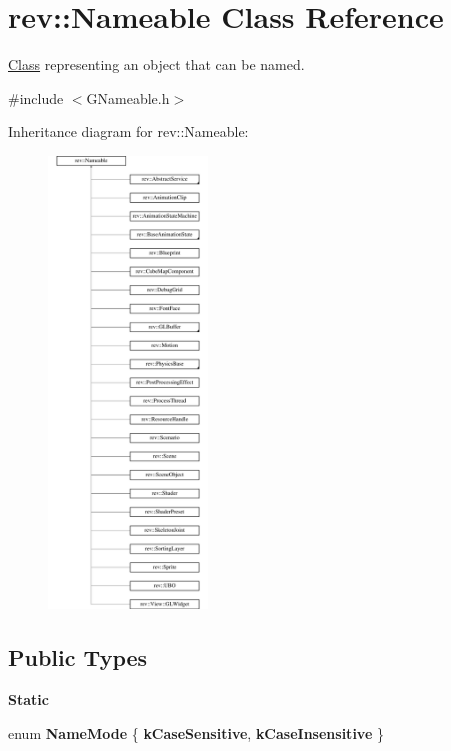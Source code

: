 \hypertarget{classrev_1_1_nameable}{}\section{rev\+::Nameable Class Reference}
\label{classrev_1_1_nameable}


\mbox{\hyperlink{struct_class}{Class}} representing an object that can be named.  




{\ttfamily \#include $<$G\+Nameable.\+h$>$}

Inheritance diagram for rev\+::Nameable\+:\begin{figure}[H]
\begin{center}
\leavevmode
\includegraphics[height=12.000000cm]{classrev_1_1_nameable}
\end{center}
\end{figure}
\subsection*{Public Types}
\begin{Indent}\textbf{ Static}\par
\begin{DoxyCompactItemize}
\item 
\mbox{\label{classrev_1_1_nameable_a8b52b2896da10432b5d4e281c854aae8}} 
enum {\bfseries Name\+Mode} \{ {\bfseries k\+Case\+Sensitive}, 
{\bfseries k\+Case\+Insensitive}
 \}
\end{DoxyCompactItemize}
\end{Indent}
